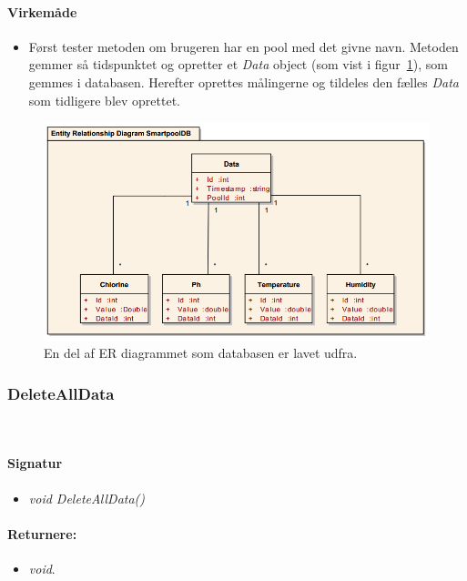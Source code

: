 \paragraph{Virkemåde}
\begin{itemize}
	\item Først tester metoden om brugeren har en pool med det givne navn. Metoden gemmer så tidspunktet og opretter et \textit{Data} object (som vist i figur~\ref{fig:datasetentity}), som gemmes i databasen. Herefter oprettes målingerne og tildeles den fælles \textit{Data} som tidligere blev oprettet.
\end{itemize}

\begin{figure}
\centering
\includegraphics[width=0.8\linewidth]{figs/implementering/datasetentity.png}
\caption{En del af ER diagrammet som databasen er lavet udfra.}
\label{fig:datasetentity}
\end{figure}






\subsubsection{DeleteAllData}\ %







\paragraph{Signatur}
\begin{itemize}
	\item \textit{void DeleteAllData()}
\end{itemize}

\paragraph{Returnere:}
\begin{itemize}
	\item \textit{void}.
\end{itemize}

